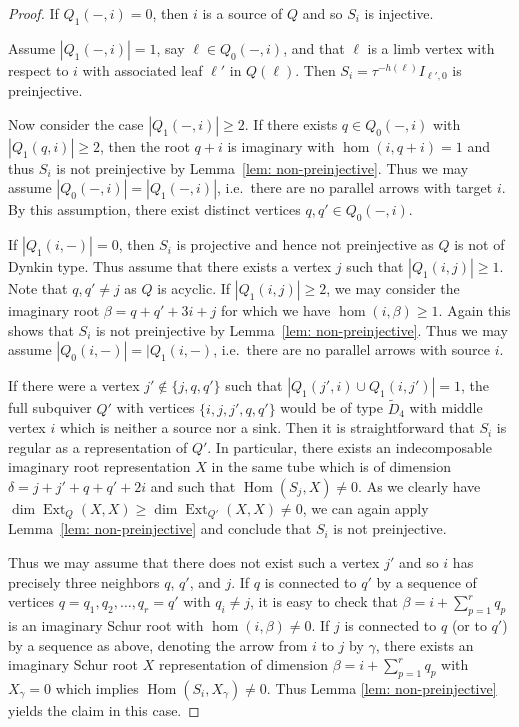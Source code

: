 \documentclass{amsart}
\numberwithin{equation}{section}
\newcommand{\Ext}{\operatorname{Ext}}
\newcommand{\Hom}{\operatorname{Hom}}
\begin{document}
\begin{proof}
  If $Q_1(-,i)=0$, then $i$ is a source of $Q$ and so $S_i$ is injective.

  Assume $|Q_1(-,i)|=1$, say $\ell\in Q_0(-,i)$, and that $\ell$ is a limb vertex with respect to $i$ with associated leaf $\ell'$ in $Q(\ell)$.
  Then $S_i=\tau^{-h(\ell)}I_{\ell',0}$ is preinjective.

  Now consider the case $|Q_1(-,i)|\geq 2$.
  If there exists $q\in Q_0(-,i)$ with $|Q_1(q,i)|\ge2$, then the root $q+i$ is imaginary with $\hom(i,q+i)=1$ and thus $S_i$ is not preinjective by Lemma~\ref{lem: non-preinjective}.
  Thus we may assume $|Q_0(-,i)|=|Q_1(-,i)|$, i.e.~there are no parallel arrows with target $i$.
  By this assumption, there exist distinct vertices $q,q'\in Q_0(-,i)$.

  If $|Q_1(i,-)|=0$, then $S_i$ is projective and hence not preinjective as $Q$ is not of Dynkin type.
  Thus assume that there exists a vertex $j$ such that $|Q_1(i,j)|\geq 1$.
  Note that $q,q'\neq j$ as $Q$ is acyclic. 
  If $|Q_1(i,j)|\geq 2$, we may consider the imaginary root $\beta=q+q'+3i+j$ for which we have $\hom(i,\beta)\geq 1$.
  Again this shows that $S_i$ is not preinjective by Lemma~\ref{lem: non-preinjective}.
  Thus we may assume $|Q_0(i,-)|=|Q_1(i,-)$, i.e.~there are no parallel arrows with source $i$.

  If there were a vertex $j'\notin \{j,q,q'\}$ such that $|Q_1(j',i)\cup Q_1(i,j')|=1$, the full subquiver $Q'$ with vertices $\{i,j,j',q,q'\}$ would be of type $\tilde D_4$ with middle vertex $i$ which is neither a source nor a sink.
  Then it is straightforward that $S_i$ is regular as a representation of $Q'$.
  In particular, there exists an indecomposable imaginary root representation $X$ in the same tube which is of dimension $\delta=j+j'+q+q'+2i$ and such that $\Hom(S_j,X)\neq 0$.
  As we clearly have $\dim\Ext_Q(X,X)\geq \dim\Ext_{Q'}(X,X)\neq 0$, we can again apply Lemma~\ref{lem: non-preinjective} and conclude that $S_i$ is not preinjective.

  Thus we may assume that there does not exist such a vertex $j'$ and so $i$ has precisely three neighbors $q$, $q'$, and $j$.
  If $q$ is connected to $q'$ by a sequence of vertices $q=q_1,q_2,\ldots,q_r=q'$ with $q_i\neq j$, it is easy to check that $\beta=i+\sum_{p=1}^rq_p$ is an imaginary Schur root with $\hom(i,\beta)\neq 0$.
  If $j$ is connected to $q$ (or to $q'$) by a sequence as above, denoting the arrow from $i$ to $j$ by $\gamma$, there exists an imaginary Schur root $X$ representation of dimension $\beta=i+\sum_{p=1}^{r}q_p$ with $X_\gamma=0$ which implies $\Hom(S_i,X_\gamma)\neq 0$.
  Thus Lemma \ref{lem: non-preinjective} yields the claim in this case. 


\end{proof}
\end{document}
